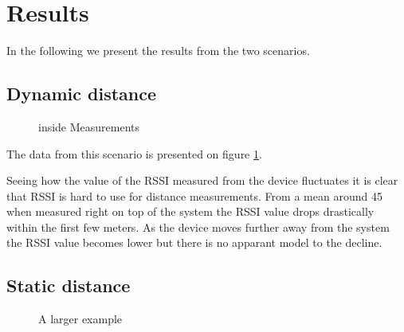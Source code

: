 \section{Results}
\label{sec_results}

In the following we present the results from the two scenarios.

\subsection{Dynamic distance}
%
%
%
%
%

\begin{figure}		
	
	
	
	\caption{ inside Measurements }
	\label{graf_InsideMesurements}
	
\end{figure}


The data from this scenario is presented on figure \cref{graf_InsideMesurements}.

Seeing how the value of the RSSI measured from the device fluctuates it is clear that RSSI is hard to use for distance measurements. From a mean around 45 when measured right on top of the system the RSSI value drops drastically within the first few meters. As the device moves further away from the system the RSSI value becomes lower but there is no apparant model to the decline.

\subsection{Static distance}


\begin{figure}
	
	
	\caption{A larger example}
\end{figure}

